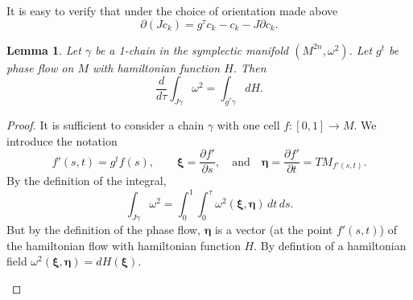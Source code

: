 \documentclass{book}
\numberwithin{equation}{section}
\theoremstyle{plain}
\newtheorem*{lem*}{Lemma}
\theoremstyle{definition}
\theoremstyle{remark}
\theoremstyle{remark}
\begin{document}
It is easy to verify that under the choice of orientation made above
\begin{equation}
\partial (J c_k) = g^\tau c_k - c_k - J \partial c_k.
\label{eq:c_homotopy}
\end{equation}

\begin{lem*}
  Let $\gamma$ be a 1-chain in the symplectic manifold $(M^{2n}, \omega^2)$.
  Let $g^t$ be phase flow on $M$ with hamiltonian function $H$.
  Then
  $$
  \frac{d}{d\tau} \int_{J\gamma} \omega^2
  =
  \int_{g^\tau\gamma} dH.
  $$
\end{lem*}

\begin{proof}
  It is sufficient to consider a chain $\gamma$ with one cell
  $f: [0,1] \rightarrow M$.
  We introduce the notation
  $$
    f'(s, t) = g^t f(s),
    \qquad
    \pmb\xi = \frac{ \partial f' } { \partial s },
    \mathrm{\quad and \quad}
    \pmb\eta = \frac{ \partial f' } { \partial t }
    = TM_{f'(s, t)}.
  $$
  By the definition of the integral,
  $$
  \int_{J\gamma} \omega^2
  =
  \int_0^1 \int_0^\tau \omega^2(\pmb\xi, \pmb\eta) \, dt \, ds.
  $$
  But by the definition of the phase flow,
  $\pmb \eta$ is a vector (at the point $f'(s, t)$)
  of the hamiltonian flow with hamiltonian function $H$.
  By defintion of a hamiltonian field
  $\omega^2(\pmb\xi, \pmb\eta) = dH(\pmb\xi)$.
  \begin{figure*}
    \centering
\end{figure*}
\end{proof}
\end{document}
